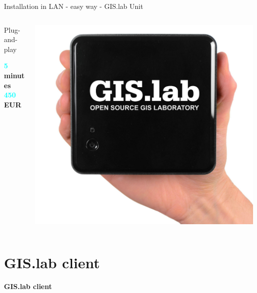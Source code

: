 \documentclass[12pt]{beamer}
\begin{document}
\begin{frame}{Installation in LAN - easy way - GIS.lab Unit}
	\begin{minipage}[\textheight]{\textwidth}
	\begin{columns}[T]
		\begin{column}{0.5\textwidth}
			\vspace{0.2\textheight}
			Plug-and-play
			\begin{flushleft}
				\textbf{\textcolor{Cyan}{5} minutes} \\
				\textbf{\textcolor{Cyan}{450} EUR} \\
			\end{flushleft}
		\end{column}
		\begin{column}{0.5\textwidth}
			\includegraphics[keepaspectratio=true,width=\textwidth]{images/gislab-unit.png}
		\end{column}
	\end{columns}
	\end{minipage}
\end{frame}


\section{GIS.lab client}
\begin{frame}
	\begin{center}
		\LARGE\textbf{GIS.lab client}
	\end{center}
\end{frame}
\end{document}

